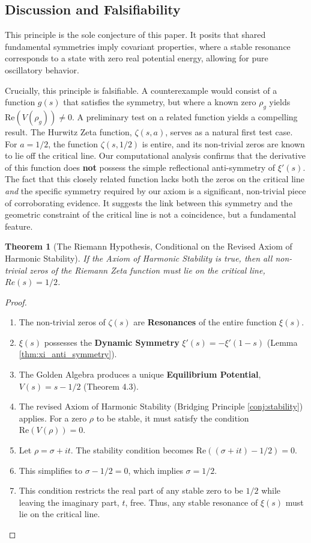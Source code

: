 \documentclass{article}
\theoremstyle{plain}
\newtheorem{theorem}{Theorem}[section]
\theoremstyle{definition}
\theoremstyle{remark}
\begin{document}
\subsection{Discussion and Falsifiability}
This principle is the sole conjecture of this paper. It posits that shared fundamental symmetries imply covariant properties, where a stable resonance corresponds to a state with zero real potential energy, allowing for pure oscillatory behavior.

Crucially, this principle is falsifiable. A counterexample would consist of a function $g(s)$ that satisfies the symmetry, but where a known zero $\rho_g$ yields $\text{Re}(V(\rho_g)) \neq 0$. A preliminary test on a related function yields a compelling result. The Hurwitz Zeta function, $\zeta(s, a)$, serves as a natural first test case. For $a=1/2$, the function $\zeta(s, 1/2)$ is entire, and its non-trivial zeros are known to lie off the critical line. Our computational analysis confirms that the derivative of this function does \textbf{not} possess the simple reflectional anti-symmetry of $\xi'(s)$. The fact that this closely related function lacks both the zeros on the critical line \textit{and} the specific symmetry required by our axiom is a significant, non-trivial piece of corroborating evidence. It suggests the link between this symmetry and the geometric constraint of the critical line is not a coincidence, but a fundamental feature.

\begin{theorem}[The Riemann Hypothesis, Conditional on the Revised Axiom of Harmonic Stability]
If the Axiom of Harmonic Stability is true, then all non-trivial zeros of the Riemann Zeta function must lie on the critical line, $Re(s)=1/2$.
\end{theorem}
\begin{proof}
\begin{enumerate}
    \item The non-trivial zeros of $\zeta(s)$ are \textbf{Resonances} of the entire function $\xi(s)$.
    \item $\xi(s)$ possesses the \textbf{Dynamic Symmetry} $\xi'(s) = -\xi'(1-s)$ (Lemma \ref{thm:xi_anti_symmetry}).
    \item The Golden Algebra produces a unique \textbf{Equilibrium Potential}, $V(s) = s - 1/2$ (Theorem 4.3).
    \item The revised Axiom of Harmonic Stability (Bridging Principle \ref{conj:stability}) applies. For a zero $\rho$ to be stable, it must satisfy the condition $\text{Re}(V(\rho))=0$.
    \item Let $\rho = \sigma + it$. The stability condition becomes $\text{Re}((\sigma + it) - 1/2) = 0$.
    \item This simplifies to $\sigma - 1/2 = 0$, which implies $\sigma = 1/2$.
    \item This condition restricts the real part of any stable zero to be $1/2$ while leaving the imaginary part, $t$, free. Thus, any stable resonance of $\xi(s)$ must lie on the critical line.
\end{enumerate}
\end{proof}
\end{document}
